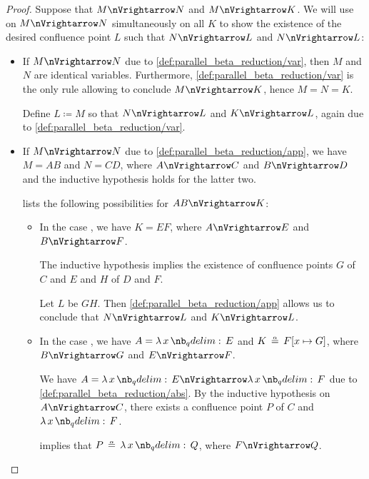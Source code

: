 \begin{proof}
  Suppose that \( M \pred N \) and \( M \pred K \). We will use  on \( M \pred N \) simultaneously on all \( K \) to show the existence of the desired confluence point \( L \) such that \( N \pred L \) and \( N \pred L \):
  \begin{itemize}
    \item If \( M \pred N \) due to \ref{def:parallel_beta_reduction/var}, then \( M \) and \( N \) are identical variables. Furthermore, \ref{def:parallel_beta_reduction/var} is the only rule allowing to conclude \( M \pred K \), hence \( M = N = K \).

    Define \( L \coloneqq M \) so that \( N \pred L \) and \( K \pred L \), again due to \ref{def:parallel_beta_reduction/var}.

    \item If \( M \pred N \) due to \ref{def:parallel_beta_reduction/app}, we have \( M = AB \) and \( N = CD \), where \( A \pred C \) and \( B \pred D \) and the inductive hypothesis holds for the latter two.

     lists the following possibilities for \( AB \pred K \):
    \begin{itemize}
      \item In the case , we have \( K = EF \), where \( A \pred E \) and \( B \pred F \).

      The inductive hypothesis implies the existence of confluence points \( G \) of \( C \) and \( E \) and \( H \) of \( D \) and \( F \).

      Let \( L \) be \( GH \). Then \ref{def:parallel_beta_reduction/app} allows us to conclude that \( N \pred L \) and \( K \pred L \).

      \item In the case , we have \( A = \qabs x E \) and \( K \aequiv F[x \mapsto G] \), where \( B \pred G \) and \( E \pred F \).

      We have \( A = \qabs x E \pred \qabs x F \) due to \ref{def:parallel_beta_reduction/abs}. By the inductive hypothesis on \( A \pred C \), there exists a confluence point \( P \) of \( C \) and \( \qabs x F \).

       implies that \( P \aequiv \qabs x Q \), where \( F \pred Q \).


\end{itemize}
\end{itemize}
\end{proof}
